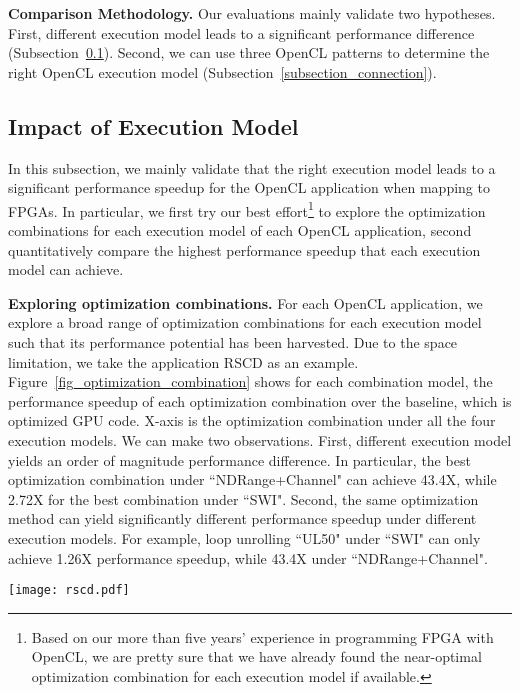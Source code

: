{\bf Comparison Methodology. }
Our evaluations mainly validate two hypotheses. First, different execution model leads to a significant performance difference (Subsection~\ref{subsec_evaluation}). Second, we can use three OpenCL patterns to determine the right OpenCL execution model (Subsection~\ref{subsection_connection}).  

\vspace{-1ex}
\subsection{Impact of Execution Model}
\label{subsec_evaluation}
In this subsection, we mainly validate that the right execution model leads to a significant performance speedup for the OpenCL application when mapping to FPGAs. In particular, we first try our best effort\footnote{Based on our more than five years' experience in programming FPGA with OpenCL, we are pretty sure that we have already found the near-optimal optimization combination for each execution model if available. } to explore the optimization combinations for each execution model of each OpenCL application, second quantitatively compare the highest performance speedup that each execution model can achieve. 


{\bf Exploring optimization combinations. }For each OpenCL application, we explore a broad range of optimization combinations for each execution model such that its performance potential has been harvested. Due to the space limitation, we take the application RSCD as an example. 
Figure~\ref{fig_optimization_combination} shows for each combination model, the performance speedup of each optimization combination over the baseline, which is optimized GPU code. X-axis is the optimization combination under all the four execution models. We can make two observations. 
First, different execution model yields an order of magnitude performance difference. In particular, the best optimization combination under ``NDRange+Channel" can achieve 43.4X, while 2.72X for the best combination under ``SWI". 
Second, the same optimization method can yield significantly different performance speedup under different execution models. For example, loop unrolling ``UL50" under ``SWI" can only achieve 1.26X performance speedup, while 43.4X under ``NDRange+Channel".  

 

\begin{figure*}[t]%
	\centering
	\texttt{[image: rscd.pdf]}
	\vspace{-3.2ex}
	\caption{Performance speedup of optimization combinations over baseline. ``CUx'' indicates x CUs, ``ULx'' indicates the loop whose unroll factor x. x-y(z)-w indicates XXX. }%
	\vspace{-3ex}
	\label{fig_optimization_combination}
\end{figure*} 



